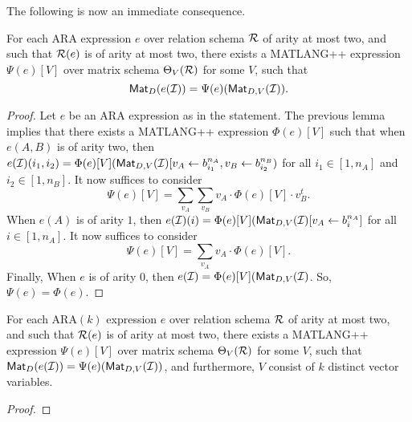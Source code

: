 The following is now an immediate consequence.
\begin{prop}
For each ARA expression $e$ over relation schema $\mathcal{R}$ of arity at most two, and such that $\mathcal{R}(e)$ is of arity at most two,  there exists a MATLANG++ expression $\Psi(e)[V]$ over  matrix schema $\Theta_V(\mathcal{R})$ for some $V$, such that 
$$
\mathsf{Mat}_{D}(e(\mathcal{I}))=\Psi(e)(\mathsf{Mat}_{D,V}(\mathcal{I})).
$$
\end{prop}
\begin{proof}
Let $e$ be an ARA expression as in the statement. The previous lemma implies that there exists a MATLANG++ expression $\Phi(e)[V]$ such that when $e(A,B)$ is of arity two, then $e(\mathcal{I})(i_1,i_2)=\Phi(e)[V](\mathsf{Mat}_{D,V}(\mathcal{I})[v_{A}\gets b_{i_1}^{n_A},v_B\gets b_{i_2}^{n_B})$ for all $i_1\in[1,n_A]$ and $i_2\in [1,n_B]$. It now suffices to consider 
$$
\Psi(e)[V]= \sum_{v_A}\sum_{v_B} v_A\cdot \Phi(e)[V]\cdot  v_B^t.
$$
When $e(A)$ is of arity $1$, then 
$e(\mathcal{I})(i)=\Phi(e)[V](\mathsf{Mat}_{D,V}(\mathcal{I})[v_{A}\gets b_{i}^{n_A}]$ for all $i\in[1,n_A]$. It now suffices to consider 
$$
\Psi(e)[V]= \sum_{v_A} v_A\cdot \Phi(e)[V].
$$
Finally, When $e$ is of arity $0$, then 
$e(\mathcal{I})=\Phi(e)[V](\mathsf{Mat}_{D,V}(\mathcal{I})$. So, $\Psi(e)=\Phi(e)$. 
\end{proof}



\begin{prop}
For each ARA$(k)$ expression $e$ over relation schema $\mathcal{R}$ of arity at most two, and such that $\mathcal{R}(e)$ is of arity at most two,  there exists a MATLANG++ expression $\Psi(e)[V]$ over  matrix schema $\Theta_V(\mathcal{R})$ for some $V$, such that $
\mathsf{Mat}_{D}(e(\mathcal{I}))=\Psi(e)(\mathsf{Mat}_{D,V}(\mathcal{I}))$, 
and furthermore, $V$ consist of $k$ distinct vector variables.
\end{prop}
\begin{proof}
\end{proof}
